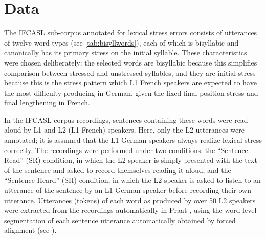 	
	\section{Data}
	\label{sec:lexstress:data}
	
	The IFCASL sub-corpus annotated for lexical stress errors consists of utterances of twelve word types (see \cref{tab:bisyllwords}), each of which is bisyllabic and canonically has its primary stress on the initial syllable. These characteristics were chosen deliberately: the selected words are bisyllabic because this simplifies comparison between stressed and unstressed syllables, and they are initial-stress because this is the stress pattern which L1 French speakers are expected to have the most difficulty producing in German, given the fixed final-position stress and final lengthening in French.
	
	In the IFCASL corpus recordings, sentences containing these words were read aloud by L1 and L2 (L1 French) speakers. Here, only the L2 utterances were annotated; it is assumed that the L1 German speakers always realize lexical stress correctly. 
	The recordings were performed under two conditions: the ``Sentence Read'' (SR) condition, in which the L2 speaker is simply  presented with the text of the sentence and asked to record themselves reading it aloud, and the ``Sentence Heard'' (SH) condition, in which the L2 speaker is asked to listen to an utterance of the sentence by an L1 German speaker before recording their own utterance.
	Utterances (tokens) of each word as produced by over 50 L2 speakers were extracted from the recordings automatically in Praat \parencite{Boersma2014}, using the word-level segmentation of each sentence utterance automatically obtained by forced alignment (see ).
	

